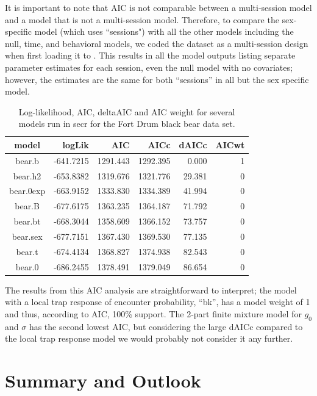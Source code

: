 It is important to note that AIC is not comparable 
between a multi-session model and a model that is not a multi-session model.
Therefore, to compare the sex-specific model (which uses ``sessions") with all the other models
including the null, time, and behavioral models, we coded the dataset as a 
multi-session design when first loading it to \secr.  This results in 
all the model outputs listing separate parameter estimates for each session, even the null model
with no covariates; however, the estimates are the same for both ``sessions''
in all but the sex specific model. 


\begin{table}[ht]
\centering
\caption{Log-likelihood, AIC, deltaAIC and AIC weight for several models run in secr for the Fort Drum black bear data set.}
\begin{tabular}{crrrrr}
\hline \hline
model     &  logLik   &   AIC    &   AICc   & dAICc  & AICwt \\ \hline
bear.b    & -641.7215 & 1291.443 & 1292.395 & 0.000  &  1 \\
bear.h2   & -653.8382 & 1319.676 & 1321.776 & 29.381 &  0 \\
bear.0exp & -663.9152 & 1333.830 & 1334.389 & 41.994 &  0 \\
bear.B    & -677.6175 & 1363.235 & 1364.187 & 71.792 &  0 \\
bear.bt   & -668.3044 & 1358.609 & 1366.152 & 73.757 &  0 \\
bear.sex  & -677.7151 & 1367.430 & 1369.530 & 77.135 &  0 \\
bear.t    & -674.4134 & 1368.827 & 1374.938 & 82.543 &  0 \\
bear.0    & -686.2455 & 1378.491 & 1379.049 & 86.654 &  0 \\ \hline
\end{tabular}
\label{covariates.tab.secrAIC}
\end{table}


The results from this AIC analysis are straightforward to interpret; the model
with a local trap response of encounter probability, ``bk'', has a model weight of 1 and thus, according to AIC, 100\% support.
The 2-part finite mixture model for $g_0$ and $\sigma$ has the second lowest
AIC, but considering the large dAICc compared to the local trap response model we would probably not consider it any further.  


\section{Summary and Outlook}

